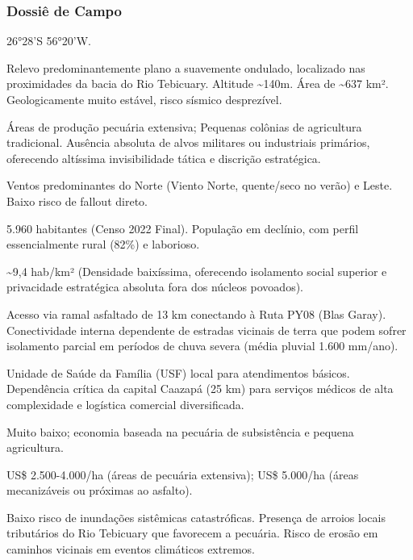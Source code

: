 \subsubsection{Dossiê de Campo}
\begin{description}[style=nextline,leftmargin=0.5cm,font=\bfseries]
\item[Coordenadas]  26°28'S 56°20'W.
\item[Topografia]  Relevo predominantemente plano a suavemente ondulado, localizado nas proximidades da bacia do Rio Tebicuary. Altitude \textasciitilde 140m. Área de \textasciitilde 637 km². Geologicamente muito estável, risco sísmico desprezível.
\item[Alvos Estratégicos]  Áreas de produção pecuária extensiva; Pequenas colônias de agricultura tradicional. Ausência absoluta de alvos militares ou industriais primários, oferecendo altíssima invisibilidade tática e discrição estratégica.
\item[Fallout]  Ventos predominantes do Norte (Viento Norte, quente/\allowbreak seco no verão) e Leste. Baixo risco de fallout direto.
\item[População]  5.960 habitantes (Censo 2022 Final). População em declínio, com perfil essencialmente rural (82\%) e laborioso.
\item[Densidade]  \textasciitilde 9,4 hab/\allowbreak km² (Densidade baixíssima, oferecendo isolamento social superior e privacidade estratégica absoluta fora dos núcleos povoados).
\item[Vias de Acesso]  Acesso via ramal asfaltado de 13 km conectando à Ruta PY08 (Blas Garay). Conectividade interna dependente de estradas vicinais de terra que podem sofrer isolamento parcial em períodos de chuva severa (média pluvial 1.600 mm/\allowbreak ano).
\item[Serviços]  Unidade de Saúde da Família (USF) local para atendimentos básicos. Dependência crítica da capital Caazapá (25 km) para serviços médicos de alta complexidade e logística comercial diversificada.
\item[Custo de Vida]  Muito baixo; economia baseada na pecuária de subsistência e pequena agricultura.
\item[Preço da Terra]  US\$ 2.500-4.000/\allowbreak ha (áreas de pecuária extensiva); US\$ 5.000/\allowbreak ha (áreas mecanizáveis ou próximas ao asfalto).
\item[Hidrologia]  Baixo risco de inundações sistêmicas catastróficas. Presença de arroios locais tributários do Rio Tebicuary que favorecem a pecuária. Risco de erosão em caminhos vicinais em eventos climáticos extremos.

\end{description}
